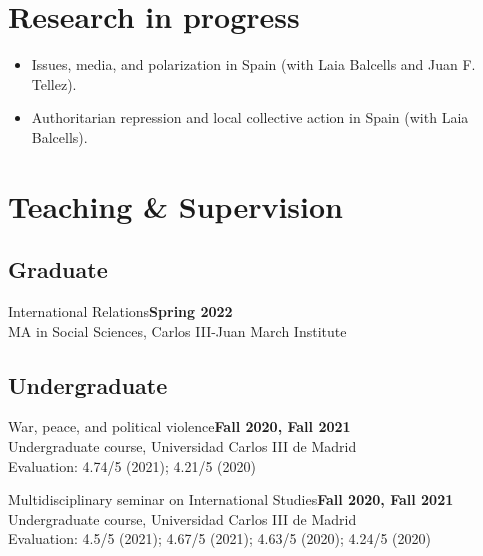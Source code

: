\documentclass[a4paper, 12pt]{article}
\begin{document}
\section*{Research in progress}

\begin{itemize}[leftmargin=*, nolistsep]
\item Issues, media, and polarization in Spain (with Laia Balcells and Juan F. Tellez).
\item Authoritarian repression and local collective action in Spain (with Laia Balcells).
\end{itemize}

\section*{Teaching \& Supervision}


\subsection*{Graduate}

\noindent
International Relations\hfill\textbf{Spring 2022}\\
{\small MA in Social Sciences, Carlos III-Juan March Institute}

\vspace{-10pt}
\subsection*{Undergraduate}

\noindent
War, peace, and political violence\hfill\textbf{Fall 2020, Fall 2021}\\
{\small Undergraduate course, Universidad Carlos III de Madrid}\\
{\small Evaluation: 4.74/5 (2021); 4.21/5 (2020)}
\vspace{10pt}

\noindent
Multidisciplinary seminar on International Studies\hfill\textbf{Fall 2020, Fall 2021}\\
{\small Undergraduate course, Universidad Carlos III de Madrid}\\
{\small Evaluation: 4.5/5 (2021); 4.67/5 (2021); 4.63/5 (2020); 4.24/5 (2020)}
\vspace{10pt}
\end{document}
